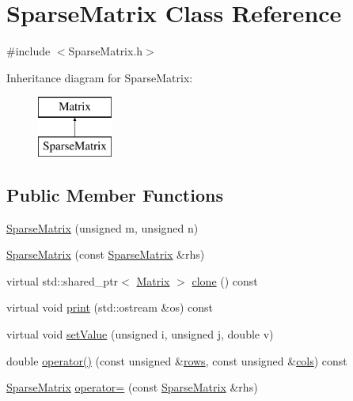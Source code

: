\hypertarget{class_sparse_matrix}{}\section{Sparse\+Matrix Class Reference}
\label{class_sparse_matrix}


{\ttfamily \#include $<$Sparse\+Matrix.\+h$>$}

Inheritance diagram for Sparse\+Matrix\+:\begin{figure}[H]
\begin{center}
\leavevmode
\includegraphics[height=2.000000cm]{class_sparse_matrix}
\end{center}
\end{figure}
\subsection*{Public Member Functions}
\begin{DoxyCompactItemize}
\item 
\mbox{\hyperlink{class_sparse_matrix_a0517d870d80dbf4f8a5b548b7f2b3666}{Sparse\+Matrix}} (unsigned m, unsigned n)
\item 
\mbox{\hyperlink{class_sparse_matrix_ab2ffd9c0ba0f03b42128e8f064658889}{Sparse\+Matrix}} (const \mbox{\hyperlink{class_sparse_matrix}{Sparse\+Matrix}} \&rhs)
\item 
virtual std\+::shared\+\_\+ptr$<$ \mbox{\hyperlink{class_matrix}{Matrix}} $>$ \mbox{\hyperlink{class_sparse_matrix_aa130f1050d2fea0a7315e26ccf280433}{clone}} () const
\item 
virtual void \mbox{\hyperlink{class_sparse_matrix_afc2c851b26215e7c91eea9fe03e13e84}{print}} (std\+::ostream \&os) const
\item 
virtual void \mbox{\hyperlink{class_sparse_matrix_ab958e2d8e207a6590d4ca3d1b10677cd}{set\+Value}} (unsigned i, unsigned j, double v)
\item 
double \mbox{\hyperlink{class_sparse_matrix_a2ce5d91d0f5106e90c13629db5d9bb59}{operator()}} (const unsigned \&\mbox{\hyperlink{class_matrix_ac1345e89dbffc411f5766c11fc8ebb6a}{rows}}, const unsigned \&\mbox{\hyperlink{class_matrix_af477fcaeda55b1d5b8ace1be7773c209}{cols}}) const
\item 
\mbox{\hyperlink{class_sparse_matrix}{Sparse\+Matrix}} \mbox{\hyperlink{class_sparse_matrix_a3ad58a60616f7d3d633b1fe96ae4f753}{operator=}} (const \mbox{\hyperlink{class_sparse_matrix}{Sparse\+Matrix}} \&rhs)
\end{DoxyCompactItemize}
